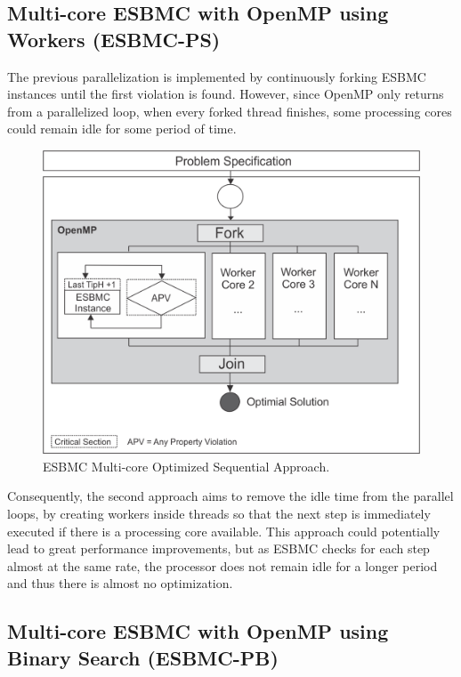 \subsection{Multi-core ESBMC with OpenMP using Workers (ESBMC-PS)}
\label{Multi-core-ESBMC-with-OpenMP-using-workers}

The previous parallelization is implemented by continuously forking ESBMC instances until the first violation is found. However, since OpenMP only returns from a parallelized loop, when every forked thread finishes, some processing cores could remain idle for some period of time.

\begin{figure}[ht]
	\centering
  \includegraphics[scale=0.75]{Image/esbmc-parallel.png} 
	\caption{ESBMC Multi-core Optimized Sequential Approach. }
	\label{ESBMC-Multi-core-Optimized-Sequential-Approach}
\end{figure}

Consequently, the second approach aims to remove the idle time from the parallel loops, by creating workers inside threads so that the next step is immediately executed if there is a processing core available. This approach could potentially lead to great performance improvements, but as ESBMC checks for each step almost at the same rate, the processor does not remain idle for a longer period and thus there is almost no optimization.

\subsection{Multi-core ESBMC with OpenMP using Binary Search (ESBMC-PB)}
\label{Multi-core-ESBMC-with-OpenMP-using-Binary-Search}

